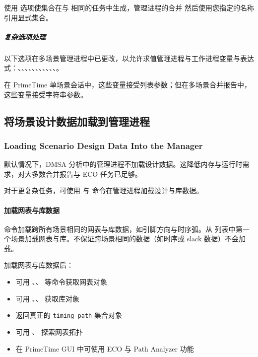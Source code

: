 使用  选项使集合在与  相同的任务中生成，管理进程的合并  然后使用您指定的名称引用显式集合。

\subparagraph{复杂选项处理}
以下选项在多场景管理进程中已更改，以允许求值管理进程与工作进程变量与表达式：、、、、、、、、、、、。

在 PrimeTime 单场景会话中，这些变量接受列表参数；但在多场景合并报告中，这些变量接受字符串参数。

\subsection{将场景设计数据加载到管理进程}
\subsubsection*{Loading Scenario Design Data Into the Manager}

默认情况下，DMSA 分析中的管理进程不加载设计数据。这降低内存与运行时需求，对大多数合并报告与 ECO 任务已足够。

对于更复杂任务，可使用  与  命令在管理进程加载设计与库数据。

\paragraph{加载网表与库数据}
 命令加载跨所有场景相同的网表与库数据，如引脚方向与时序弧。从  列表中第一个场景加载网表与库。不保证跨场景相同的数据（如时序或 slack 数据）不会加载。

加载网表与库数据后：
\begin{itemize}
  \item 可用 、、 等命令获取网表对象
  \item 可用 、、 获取库对象
  \item {} 返回真正的 \texttt{timing\_path} 集合对象
  \item 可用 、 探索网表拓扑
  \item 在 PrimeTime GUI 中可使用 ECO 与 Path Analyzer 功能
\end{itemize}

